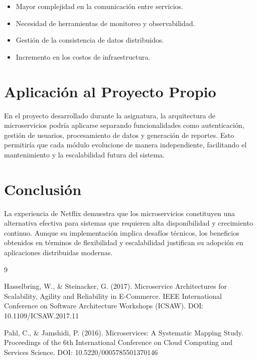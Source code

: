 \documentclass[12pt]{article}
\begin{document}
\begin{itemize}
\item Mayor complejidad en la comunicación entre servicios.
\item Necesidad de herramientas de monitoreo y observabilidad.
\item Gestión de la consistencia de datos distribuidos.
\item Incremento en los costos de infraestructura.
\end{itemize}

\section{Aplicación al Proyecto Propio}

En el proyecto desarrollado durante la asignatura, la arquitectura de microservicios podría aplicarse separando funcionalidades como autenticación, gestión de usuarios, procesamiento de datos y generación de reportes. Esto permitiría que cada módulo evolucione de manera independiente, facilitando el mantenimiento y la escalabilidad futura del sistema.

\section{Conclusión}

La experiencia de Netflix demuestra que los microservicios constituyen una alternativa efectiva para sistemas que requieren alta disponibilidad y crecimiento continuo. Aunque su implementación implica desafíos técnicos, los beneficios obtenidos en términos de flexibilidad y escalabilidad justifican su adopción en aplicaciones distribuidas modernas.

\begin{thebibliography}{9}

Hasselbring, W., \& Steinacker, G. (2017).
Microservice Architectures for Scalability, Agility and Reliability in E-Commerce.
IEEE International Conference on Software Architecture Workshops (ICSAW).
DOI: 10.1109/ICSAW.2017.11

Pahl, C., \& Jamshidi, P. (2016).
Microservices: A Systematic Mapping Study.
Proceedings of the 6th International Conference on Cloud Computing and Services Science.
DOI: 10.5220/0005785501370146

\end{thebibliography}
\end{document}

